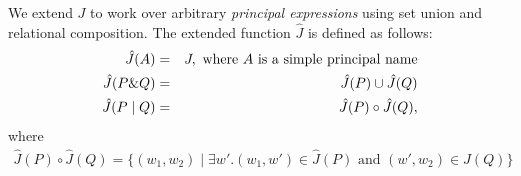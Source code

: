 We extend $J$ to work over arbitrary \emph{principal expressions}
using set union and relational composition. The extended function
$\hat{J}$ is defined as follows:
\begin{eqnarray*}
  \hat{J}(A) & = & J, \text{ where $A$ is a simple principal name}\\
  \hat{J}(P \& Q) & = & \hat{J}(P) \cup \hat{J}(Q) \\
  \hat{J}(P \mid Q) & = & \hat{J}(P) \circ \hat{J}(Q),  
\end{eqnarray*}
where
\begin{gather*}
  \hat{J}(P) \circ \hat{J}(Q) = \{(w_1, w_2) \mid \exists w'. (w_1,
  w') \in \hat{J}(P) \text{ and } (w', w_2) \in \hat{J}(Q)\}
\end{gather*}
